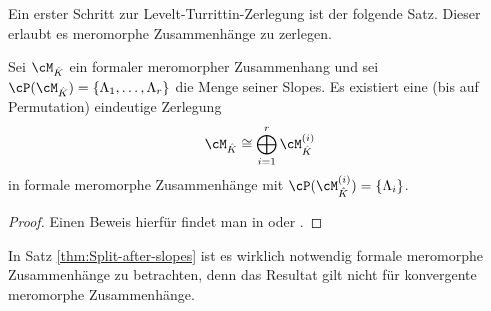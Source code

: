 \begin{defcor}
Ein erster Schritt zur Levelt-Turrittin-Zerlegung ist der folgende Satz. Dieser
erlaubt es meromorphe Zusammenhänge  zu
zerlegen.
\begin{thm} \label{thm:Split-after-slopes}
Sei $\cM_{\hat{K}}$ ein formaler meromorpher Zusammenhang und sei
$\cP(\cM_{\hat K})=\{\Lambda_1,\dots,\Lambda_r\}$ die Menge seiner
Slopes. Es existiert eine (bis auf Permutation) eindeutige Zerlegung
\[
\cM_{\hat K}\cong\bigoplus_{i=1}^r\cM_{\hat K}^{(i)}
\]
in formale meromorphe Zusammenhänge
mit $\cP(\cM_{\hat K}^{(i)})=\{\Lambda_i\}$.
\end{thm}
\begin{proof}
Einen Beweis hierfür findet man in \cite[Thm 5.3.1]{sabbah_cimpa90} oder
\cite[5.15]{ZulaBarbara}.
\end{proof}
\begin{bem}
In Satz \ref{thm:Split-after-slopes} ist es wirklich notwendig formale
meromorphe Zusammenhänge zu betrachten, denn das Resultat gilt nicht für
konvergente meromorphe Zusammenhänge.
\end{bem}
\begin{comment}
\begin{exmp}
\cite[Ex 5.3.6]{sabbah_cimpa90}
Sei $P=x(x\partial_x)^2+x\partial_x+\frac{1}{2}$. So sieht das Newton-Polygon
wie folgt aus
\begin{figure}[H] %
\begin{center}
  \begin{tikzpicture}[scale=1.5,descr/.style={fill=white,inner sep=2.5pt}]
  \def\myPoints{0/0,1/0,2/1}
  \def\myPath{ -- (1,0) -- node[descr]{$1$} (2,1)}
  \myPlotFunction{\myPoints}{\myPath}{2}{0}{1}{$N(P)$}
  \end{tikzpicture}
\end{center}
\caption{Newton-Polygon zu $P=x(x\partial_x)^2+x\partial_x+\frac{1}{2}$}
\end{figure}
mit den Slopes $\cP(P)=\{0,1\}=:\{\Lambda_1,\Lambda_2\}$. Nach dem Satz
\ref{thm:Split-after-slopes} existiert eine Zerlegung $P=P_1\cdot P_2$ mit
$\cP(P_1)=\{\Lambda_1\}$ und $\cP(P_2)=\{\Lambda_2\}$. Durch scharfes hinsehen
erkennt man, dass
\begin{align*}
P &= x(x\partial_x)^2+x\partial_x+\frac{1}{2}\\
  &\dots\\
  &= (x(x\partial_x)+\dots)\cdot(x\partial_x+\dots)\\
  &\dots\\
  &= P_1\cdot P_2
\end{align*}

\end{comment}
\end{defcor}
